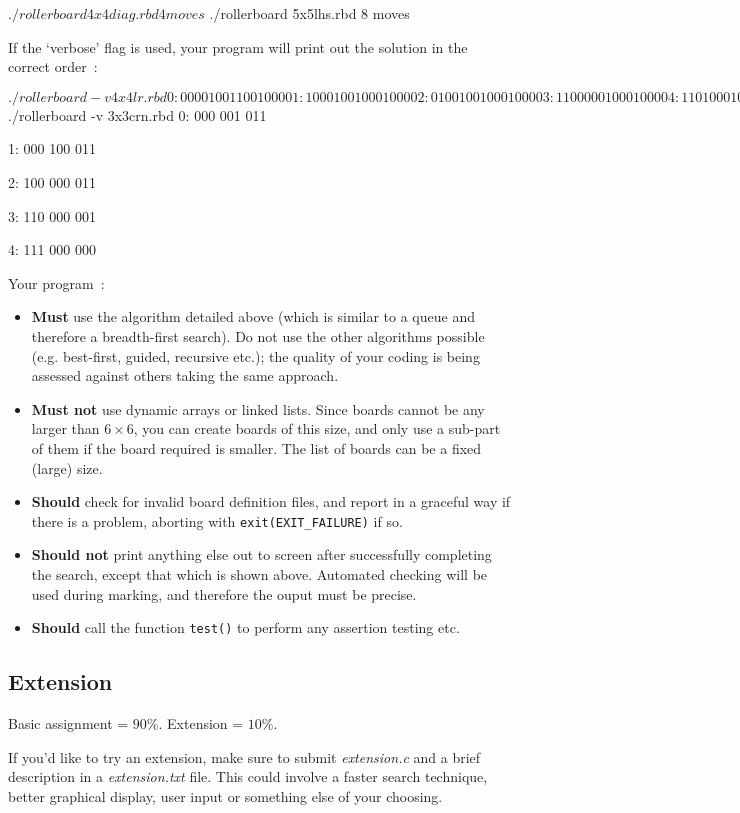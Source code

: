 \begin{exercise}
\begin{terminaloutput}
$ ./rollerboard 4x4diag.rbd
4 moves
$ ./rollerboard 5x5lhs.rbd
8 moves
\end{terminaloutput}


If the `verbose' flag is used, your program will print out the solution in the correct order~:
\begin{terminaloutput}
$ ./rollerboard -v 4x4lr.rbd
0:
0000
1001
1001
0000

1:
1000
1001
0001
0000

2:
0100
1001
0001
0000

3:
1100
0001
0001
0000

4:
1101
0001
0000
0000

5:
1110
0001
0000
0000

6:
1111
0000
0000
0000 

$ ./rollerboard -v 3x3crn.rbd
0:
000
001
011

1:
000
100
011

2:
100
000
011

3:
110
000
001

4:
111
000
000

\end{terminaloutput}

\noindent
Your program~:
\begin{itemize}
\item {\bf Must} use the algorithm detailed above (which is similar to a queue and therefore a breadth-first search). Do not use the other algorithms possible (e.g. best-first, guided, recursive etc.); the quality of your coding is being assessed against others taking the same approach.
\item {\bf Must not} use dynamic arrays or linked lists. Since boards cannot be any larger than $6 \times 6$, you can create boards of this size, and only use a sub-part of them if the board required is smaller. The list of boards can be a fixed (large) size.
\item {\bf Should} check for invalid board definition files, and report in a graceful way if there is a problem, aborting with \verb^exit(EXIT_FAILURE)^ if so.
\item {\bf Should not} print anything else out to screen after successfully
completing the search, except that which is shown above. Automated checking
will be used during marking, and therefore the ouput must be precise.
\item {\bf Should} call the function \verb^test()^ to perform any assertion testing etc.
\end{itemize}


\subsection*{Extension}

Basic assignment = {\Large $90\%$}.
Extension = {\Large $10\%$}.

\noindent
If you'd like to try an extension, make sure to submit {\it extension.c}
and a brief description in a {\it extension.txt} file. This could
involve a faster search technique, better graphical display, user input
or something else of your choosing.

\end{exercise}
